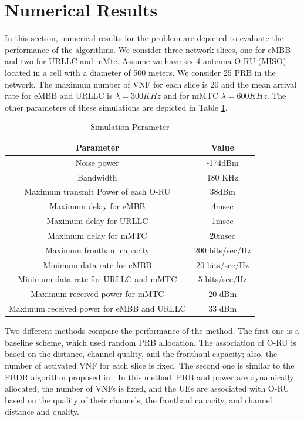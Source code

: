 \documentclass[conference]{IEEEtran}
\begin{document}
\section{Numerical Results}\label{NE}
In this section, numerical results for the problem are depicted to evaluate the performance of the algorithms. We consider three network slices, one for eMBB and two for URLLC and mMtc.
Assume we have six 4-antenna O-RU (MISO) located in a cell with a diameter of 500 meters. We consider 25 PRB in the network.
The maximum number of VNF for each slice is 20 and the mean arrival rate for eMBB and URLLC is $\lambda  = 300KHz$ and for mMTC $\lambda  = 600KHz$. 
The other parameters of these simulations are depicted in Table \ref{table:1a}.
\begin{table}
 \caption {Simulation Parameter} \label{table:1a}
 \begin{center}
  \begin{tabular}{||c c ||}
  \hline
Parameter & Value \\ [0.5ex]
  \hline\hline
  Noise power & -174dBm\\
  \hline
  Bandwidth & 180 KHz \\
  \hline
 Maximum transmit Power of each O-RU & 38dBm \\
  \hline
  Maximum delay for eMBB &  4msec \\
  \hline
    Maximum delay for URLLC &  1msec \\
  \hline
  Maximum delay for mMTC &  20msec \\
  \hline
  Maximum fronthaul capacity  & 200 bits/sec/Hz \\
   \hline
  Minimum data rate for eMBB &  20 bits/sec/Hz \\ 
  \hline
   Minimum data rate for URLLC and mMTC &  5 bits/sec/Hz \\ 
  \hline
   Maximum received power for mMTC &  20 dBm \\ [.5ex]   
  \hline
    Maximum received power for eMBB and URLLC &  33 dBm \\ [.5ex]   
  \hline
 \end{tabular}
 \end{center}
 \end{table}
Two different methods compare the performance of the method.
 The first one is a baseline scheme, which used random PRB allocation. The association of O-RU is based on the distance, channel quality, and the fronthaul capacity; also, the number of activated VNF for each slice is fixed. 
The second one is similar to the FBDR algorithm proposed in \cite{lee2018dynamic}. In this method, PRB and power are dynamically allocated, the number of VNFs is fixed, and the UEs are associated with O-RU based on the quality of their channels, the fronthaul capacity, and channel distance and quality.
\end{document}
